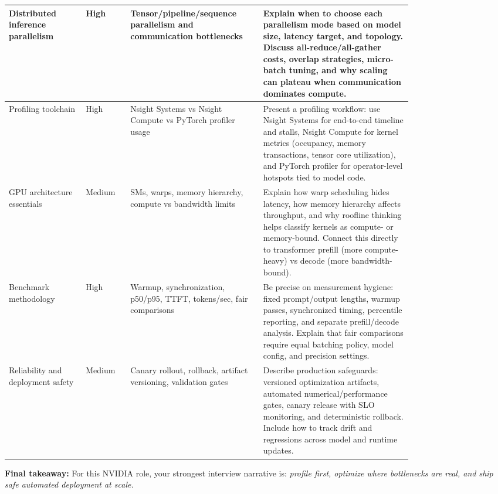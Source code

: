\documentclass[11pt]{article}
\begin{document}
\begin{longtable}{|p{0.16\linewidth}|p{0.09\linewidth}|p{0.24\linewidth}|p{0.31\linewidth}|}
\hline
Distributed inference parallelism & High & Tensor/pipeline/sequence parallelism and communication bottlenecks & Explain when to choose each parallelism mode based on model size, latency target, and topology. Discuss all-reduce/all-gather costs, overlap strategies, micro-batch tuning, and why scaling can plateau when communication dominates compute. \\
\hline
Profiling toolchain & High & Nsight Systems vs Nsight Compute vs PyTorch profiler usage & Present a profiling workflow: use Nsight Systems for end-to-end timeline and stalls, Nsight Compute for kernel metrics (occupancy, memory transactions, tensor core utilization), and PyTorch profiler for operator-level hotspots tied to model code. \\
\hline
GPU architecture essentials & Medium & SMs, warps, memory hierarchy, compute vs bandwidth limits & Explain how warp scheduling hides latency, how memory hierarchy affects throughput, and why roofline thinking helps classify kernels as compute- or memory-bound. Connect this directly to transformer prefill (more compute-heavy) vs decode (more bandwidth-bound). \\
\hline
Benchmark methodology & High & Warmup, synchronization, p50/p95, TTFT, tokens/sec, fair comparisons & Be precise on measurement hygiene: fixed prompt/output lengths, warmup passes, synchronized timing, percentile reporting, and separate prefill/decode analysis. Explain that fair comparisons require equal batching policy, model config, and precision settings. \\
\hline
Reliability and deployment safety & Medium & Canary rollout, rollback, artifact versioning, validation gates & Describe production safeguards: versioned optimization artifacts, automated numerical/performance gates, canary release with SLO monitoring, and deterministic rollback. Include how to track drift and regressions across model and runtime updates. \\
\hline
\end{longtable}

\begin{tcolorbox}[colback=insight]
\textbf{Final takeaway:} For this NVIDIA role, your strongest interview narrative is: \textit{profile first, optimize where bottlenecks are real, and ship safe automated deployment at scale.}
\end{tcolorbox}
\end{document}
